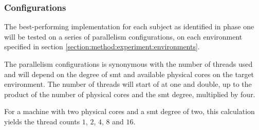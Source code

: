 \subsubsection{Configurations}
\label{section:method:experiment:phase2:configurations}

The best-performing implementation for each subject as identified in phase one will be tested on a series of parallelism configurations, on each environment specified in section \ref{section:method:experiment:environments}.

The parallelism configurations is synonymous with the number of threads used and will depend on the degree of \gls{smt} and available physical cores on the target environment. The number of threads will start of at one and double, up to the product of the number of physical cores and the \gls{smt} degree, multiplied by four.

For a machine with two physical cores and a \gls{smt} degree of two, this calculation yields the thread counts $1$, $2$, $4$, $8$ and $16$.

